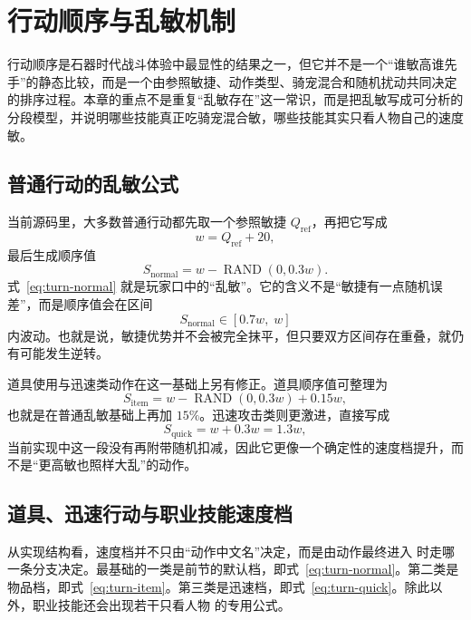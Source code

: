 \chapter{行动顺序与乱敏机制}

行动顺序是石器时代战斗体验中最显性的结果之一，但它并不是一个“谁敏高谁先手”的静态比较，而是一个由参照敏捷、动作类型、骑宠混合和随机扰动共同决定的排序过程。本章的重点不是重复“乱敏存在”这一常识，而是把乱敏写成可分析的分段模型，并说明哪些技能真正吃骑宠混合敏，哪些技能其实只看人物自己的速度敏。

\section{普通行动的乱敏公式}

当前源码里，大多数普通行动都先取一个参照敏捷 $Q_{\mathrm{ref}}$，再把它写成
\begin{equation}
    w = Q_{\mathrm{ref}} + 20,
\end{equation}
最后生成顺序值
\begin{equation}
    S_{\mathrm{normal}} = w - \operatorname{RAND}(0,0.3w).
    \label{eq:turn-normal}
\end{equation}
式~\eqref{eq:turn-normal} 就是玩家口中的“乱敏”。它的含义不是“敏捷有一点随机误差”，而是顺序值会在区间
\begin{equation}
    S_{\mathrm{normal}} \in [0.7w,\; w]
\end{equation}
内波动。也就是说，敏捷优势并不会被完全抹平，但只要双方区间存在重叠，就仍有可能发生逆转。

道具使用与迅速类动作在这一基础上另有修正。道具顺序值可整理为
\begin{equation}
    S_{\mathrm{item}} = w - \operatorname{RAND}(0,0.3w) + 0.15w,
    \label{eq:turn-item}
\end{equation}
也就是在普通乱敏基础上再加 $15\%$。迅速攻击类则更激进，直接写成
\begin{equation}
    S_{\mathrm{quick}} = w + 0.3w = 1.3w,
    \label{eq:turn-quick}
\end{equation}
当前实现中这一段没有再附带随机扣减，因此它更像一个确定性的速度档提升，而不是“更高敏也照样大乱”的动作。

\section{道具、迅速行动与职业技能速度档}

从实现结构看，速度档并不只由“动作中文名”决定，而是由动作最终进入  时走哪一条分支决定。最基础的一类是前节的默认档，即式~\eqref{eq:turn-normal}。第二类是物品档，即式~\eqref{eq:turn-item}。第三类是迅速档，即式~\eqref{eq:turn-quick}。除此以外，职业技能还会出现若干只看人物  的专用公式。

